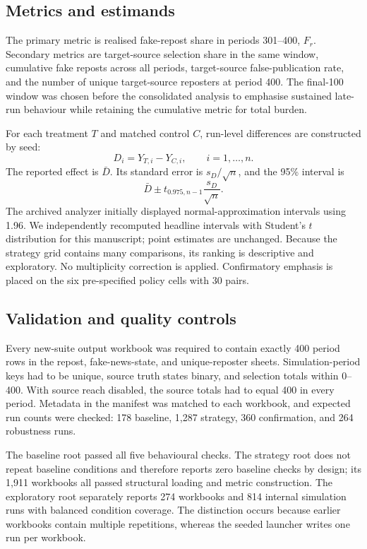 \subsection{Metrics and estimands}

The primary metric is realised fake-repost share in periods 301--400, $F_r$. Secondary metrics are target-source selection share in the same window, cumulative fake reposts across all periods, target-source false-publication rate, and the number of unique target-source reposters at period 400. The final-100 window was chosen before the consolidated analysis to emphasise sustained late-run behaviour while retaining the cumulative metric for total burden.

For each treatment $T$ and matched control $C$, run-level differences are constructed by seed:
\begin{equation}
D_i = Y_{T,i} - Y_{C,i}, \qquad i=1,\ldots,n.
\end{equation}
The reported effect is $\bar{D}$. Its standard error is $s_D/\sqrt{n}$, and the 95\% interval is
\begin{equation}
\bar{D} \pm t_{0.975,n-1}\frac{s_D}{\sqrt{n}}.
\end{equation}
The archived analyzer initially displayed normal-approximation intervals using 1.96. We independently recomputed headline intervals with Student's $t$ distribution for this manuscript; point estimates are unchanged. Because the strategy grid contains many comparisons, its ranking is descriptive and exploratory. No multiplicity correction is applied. Confirmatory emphasis is placed on the six pre-specified policy cells with 30 pairs.

\subsection{Validation and quality controls}

Every new-suite output workbook was required to contain exactly 400 period rows in the repost, fake-news-state, and unique-reposter sheets. Simulation-period keys had to be unique, source truth states binary, and selection totals within 0--400. With source reach disabled, the source totals had to equal 400 in every period. Metadata in the manifest was matched to each workbook, and expected run counts were checked: 178 baseline, 1,287 strategy, 360 confirmation, and 264 robustness runs.

The baseline root passed all five behavioural checks. The strategy root does not repeat baseline conditions and therefore reports zero baseline checks by design; its 1,911 workbooks all passed structural loading and metric construction. The exploratory root separately reports 274 workbooks and 814 internal simulation runs with balanced condition coverage. The distinction occurs because earlier workbooks contain multiple repetitions, whereas the seeded launcher writes one run per workbook.

